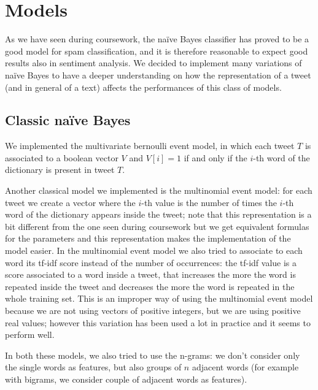 \section*{Models}
As we have seen during coursework, the na\"ive Bayes classifier has proved to be a good model for spam classification, and it is therefore reasonable to expect good results also in sentiment analysis. We decided to implement many variations of na\"ive Bayes to have a deeper understanding on how the representation of a tweet (and in general of a text) affects the performances of this class of models.
\subsection*{Classic na\"ive Bayes}
We implemented the multivariate bernoulli event model, in which each tweet $T$ is associated to a boolean vector $V$ and $V[i]=1$ if and only if the $i$-th word of the dictionary is present in tweet $T$.

Another classical model we implemented is the multinomial event model: for each tweet we create a vector where the $i$-th value is the number of times the $i$-th word of the dictionary appears inside the tweet; note that this representation is a bit different from the one seen during coursework but we get equivalent formulas for the parameters and this representation makes the implementation of the model easier. In the multinomial event model we also tried to associate to each word its tf-idf score instead of the number of occurrences: the tf-idf value is a score associated to a word inside a tweet, that increases the more the word is repeated inside the tweet and decreases the more the word is repeated in the whole training set. This is an improper way of using the multinomial event model because we are not using vectors of positive integers, but we are using positive real values; however this variation has been used a lot in practice and it seems to perform well.

In both these models, we also tried to use the n-grams: we don't consider only the single words as features, but also groups of $n$ adjacent words (for example with bigrams, we consider couple of adjacent words as features).

